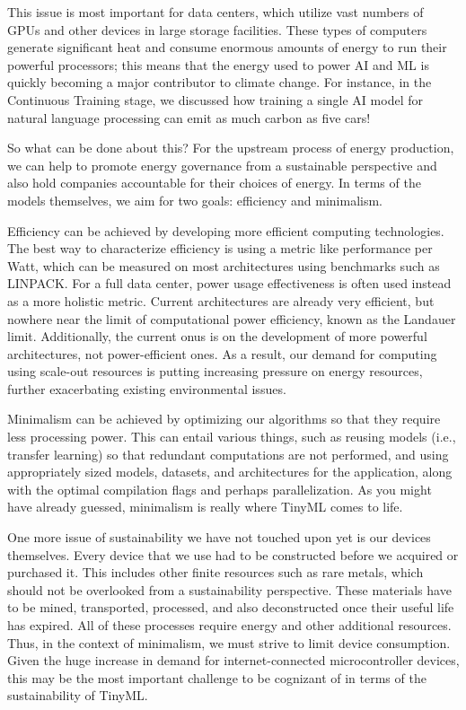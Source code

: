 {{{{{{{{    This issue is most important for data centers, which utilize vast numbers of GPUs and other devices in large storage facilities. These types of computers generate significant heat and consume enormous amounts of energy to run their powerful processors; this means that the energy used to power AI and ML is quickly becoming a major contributor to climate change. For ​​instance, in the Continuous Training stage, we discussed how training a single AI model for natural language processing can emit as much carbon as five cars!
    
    So what can be done about this? For the upstream process of energy production, we can help to promote energy governance from a sustainable perspective and also hold companies accountable for their choices of energy. In terms of the models themselves, we aim for two goals: efficiency and minimalism.
    
    Efficiency can be achieved by developing more efficient computing technologies. The best way to characterize efficiency is using a metric like performance per Watt, which can be measured on most architectures using benchmarks such as LINPACK. For a full data center, power usage effectiveness is often used instead as a more holistic metric. Current architectures are already very efficient, but nowhere near the limit of computational power efficiency, known as the Landauer limit. Additionally, the current onus is on the development of more powerful architectures, not power-efficient ones. As a result, our demand for computing using scale-out resources is putting increasing pressure on energy resources, further exacerbating existing environmental issues.
    
    Minimalism can be achieved by optimizing our algorithms so that they require less processing power. This can entail various things, such as reusing models (i.e., transfer learning) so that redundant computations are not performed, and using appropriately sized models, datasets, and architectures for the application, along with the optimal compilation flags and perhaps parallelization. As you might have already guessed, minimalism is really where TinyML comes to life.
    
    One more issue of sustainability we have not touched upon yet is our devices themselves. Every device that we use had to be constructed before we acquired or purchased it. This includes other finite resources such as rare metals, which should not be overlooked from a sustainability perspective. These materials have to be mined, transported, processed, and also deconstructed once their useful life has expired. All of these processes require energy and other additional resources. Thus, in the context of minimalism, we must strive to limit device consumption. Given the huge increase in demand for internet-connected microcontroller devices, this may be the most important challenge to be cognizant of in terms of the sustainability of TinyML.
    
}}}}}}}}
